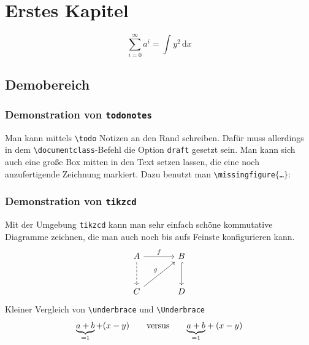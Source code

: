\chapter{Erstes Kapitel} %
\label{cha:erstes_kapitel}
\[
	\sum_{i=0}^{\infty} a^i = \int y^2 \,\mathrm{d} x 
\]

\section{Demobereich} %
\subsection{Demonstration von \texttt{todonotes}} 
Man kann mittels \texttt{\textbackslash{}todo} Notizen an den Rand schreiben. Dafür muss allerdings in dem \texttt{\textbackslash{}documentclass}-Befehl die Option \texttt{draft} gesetzt sein. Man kann sich auch eine große Box mitten in den Text setzen lassen, die eine noch anzufertigende Zeichnung markiert. Dazu benutzt man \texttt{\textbackslash{}missingfigure$\{$\ldots$\}$}:

\subsection{Demonstration von \texttt{tikzcd}}
Mit der Umgebung \texttt{tikzcd} kann man sehr einfach schöne kommutative Diagramme zeichnen, die man auch noch bis aufs Feinste konfigurieren kann.
\[
	\begin{tikzcd}[sep=large]
		A \rar["f"] \dar[dashed] & B \dar[hook] \\
		C \urar["g"] & D
	\end{tikzcd}
\]
Kleiner Vergleich von \texttt{\textbackslash{}underbrace} und \texttt{\textbackslash{}Underbrace}
\[
	\underbrace{a+b}_{=1} + (x-y) \qquad \text{versus} \qquad {\underbrace{a+b}_{=1}} + (x-y)
\]

